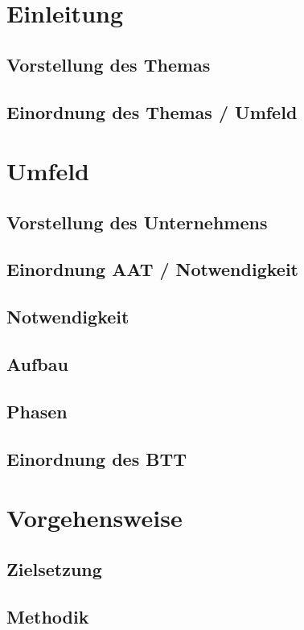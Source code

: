 \documentclass[12pt, titlepage]{article}
\begin{document}


\doublespacing


\section{Einleitung}
\subsection{Vorstellung des Themas}
\subsection{Einordnung des Themas / Umfeld}

\newpage
\section{Umfeld}
\subsection{Vorstellung des Unternehmens}
\subsection{Einordnung AAT / Notwendigkeit}
\subsection{Notwendigkeit}
\subsection{Aufbau}
\subsection{Phasen}
\subsection{Einordnung des BTT}

\newpage
\section{Vorgehensweise}
\subsection{Zielsetzung}
\subsection{Methodik}
\end{document}
